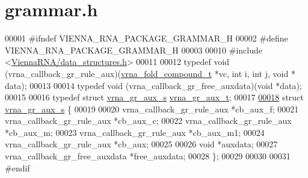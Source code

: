 \hypertarget{grammar_8h_source}{}\section{grammar.\+h}
\label{grammar_8h_source}

\begin{DoxyCode}
00001 \textcolor{preprocessor}{#ifndef VIENNA\_RNA\_PACKAGE\_GRAMMAR\_H}
00002 \textcolor{preprocessor}{#define VIENNA\_RNA\_PACKAGE\_GRAMMAR\_H}
00003 
00010 \textcolor{preprocessor}{#include <\hyperlink{data__structures_8h}{ViennaRNA/data\_structures.h}>}
00011 
00012 \textcolor{keyword}{typedef} void (vrna\_callback\_gr\_rule\_aux)(\hyperlink{group__fold__compound_structvrna__fc__s}{vrna\_fold\_compound\_t} *vc, \textcolor{keywordtype}{int} i, \textcolor{keywordtype}{int} j, \textcolor{keywordtype}{void} *
      data);
00013 
00014 \textcolor{keyword}{typedef} void (vrna\_callback\_gr\_free\_auxdata)(\textcolor{keywordtype}{void} *data);
00015 
00016 \textcolor{keyword}{typedef} \textcolor{keyword}{struct }\hyperlink{structvrna__gr__aux__s}{vrna\_gr\_aux\_s}  \hyperlink{structvrna__gr__aux__s}{vrna\_gr\_aux\_t};
00017 
\hyperlink{structvrna__gr__aux__s}{00018} \textcolor{keyword}{struct }\hyperlink{structvrna__gr__aux__s}{vrna\_gr\_aux\_s} \{
00019 
00020   vrna\_callback\_gr\_rule\_aux     *cb\_aux\_f;
00021   vrna\_callback\_gr\_rule\_aux     *cb\_aux\_c;
00022   vrna\_callback\_gr\_rule\_aux     *cb\_aux\_m;
00023   vrna\_callback\_gr\_rule\_aux     *cb\_aux\_m1;
00024   vrna\_callback\_gr\_rule\_aux     *cb\_aux;
00025 
00026   \textcolor{keywordtype}{void}                          *auxdata;
00027   vrna\_callback\_gr\_free\_auxdata *free\_auxdata;
00028 \};
00029 
00030 
00031 \textcolor{preprocessor}{#endif}
\end{DoxyCode}
